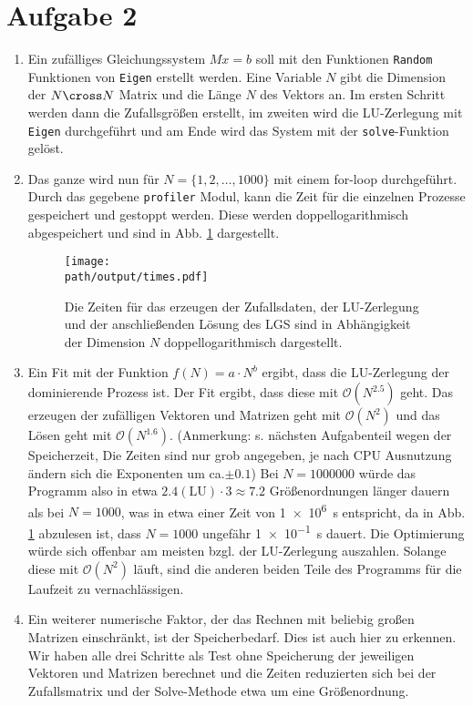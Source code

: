 \section*{Aufgabe 2}

\begin{enumerate}[label=\alph*)]
    \item Ein zufälliges Gleichungssystem $Mx = b$ soll mit den Funktionen \texttt{Random} Funktionen von \texttt{Eigen} erstellt werden. 
    Eine Variable $N$ gibt die Dimension der $N \cross N$ Matrix und die Länge $N$ des Vektors an.
    Im ersten Schritt werden dann die Zufallsgrößen erstellt, im zweiten wird die LU-Zerlegung mit \texttt{Eigen} durchgeführt und am Ende wird das System mit der \texttt{solve}-Funktion gelöst.
    \item Das ganze wird nun für $N = \{1, 2, \dots, 1000\}$ mit einem for-loop durchgeführt. Durch das gegebene \texttt{profiler} Modul, kann die Zeit für die einzelnen Prozesse gespeichert und gestoppt werden. 
    Diese werden doppellogarithmisch abgespeichert und sind in Abb. \ref{fig:times} dargestellt.

    \begin{figure}
        \centering
        \texttt{[image: \\path/output/times.pdf]}
        \caption{Die Zeiten für das erzeugen der Zufallsdaten, der LU-Zerlegung und der anschließenden Lösung des LGS sind in Abhängigkeit der Dimension $N$ doppellogarithmisch dargestellt.}
        \label{fig:times}
    \end{figure}
\item Ein Fit mit der Funktion $f(N) = a \cdot N^b$ ergibt, dass die LU-Zerlegung der dominierende Prozess ist. Der Fit ergibt, dass diese mit $\mathcal{O}(N^{2.5})$ geht. Das erzeugen der zufälligen Vektoren und Matrizen geht mit $\mathcal{O}(N^{2})$ und das Lösen geht mit $\mathcal{O}(N^{1.6})$. (Anmerkung: s. nächsten Aufgabenteil wegen der Speicherzeit, Die Zeiten sind nur grob angegeben, je nach CPU Ausnutzung ändern sich die Exponenten um  ca.$\pm 0.1$)
    Bei $N = \num{1000000}$ würde das Programm also in etwa $2.4 (\text{LU}) \cdot 3 \approx 7.2$ Größenordnungen länger dauern als bei $N=\num{1000}$, was in etwa einer Zeit von \SI{1e6}{\second} entspricht, da in Abb. \ref{fig:times} abzulesen ist, dass $N=\num{1000}$ ungefähr \SI{1e-1}{\second} dauert. 
    Die Optimierung würde sich offenbar am meisten bzgl. der LU-Zerlegung auszahlen. Solange diese mit $\mathcal{O}(N^2)$ läuft, sind die anderen beiden Teile des Programms für die Laufzeit zu vernachlässigen.
    \item Ein weiterer numerische Faktor, der das Rechnen mit beliebig großen Matrizen einschränkt, ist der Speicherbedarf. Dies ist auch hier zu erkennen. Wir haben alle drei Schritte als Test ohne Speicherung der jeweiligen Vektoren und Matrizen berechnet und die Zeiten reduzierten sich bei der Zufallsmatrix und der Solve-Methode etwa um eine Größenordnung.
\end{enumerate}
